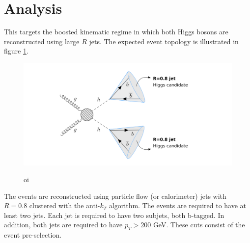 
\section{Analysis}
\label{sec:imple}


This targets the boosted kinematic regime in which both Higgs bosons are reconstructed using large $R$ jets. The expected event topology is illustrated in figure \ref{fig:boosted}.

\begin{figure}[h]
	\centering
	\includegraphics[trim={4.5cm .5cm 1cm .5cm},clip,width=1.2\linewidth]{./images/boosted1.png}
	\label{fig:boosted}
	\caption{oi}
\end{figure}

The events are reconstructed using particle flow (or calorimeter) jets with $R=0.8$ clustered with the anti-$k_T$ algorithm. The events are required to have at least two jets. Each jet is required to have two subjets, both b-tagged. In addition, both jets are required to have $p_T>200$ GeV. These cuts consist of the event pre-selection.


